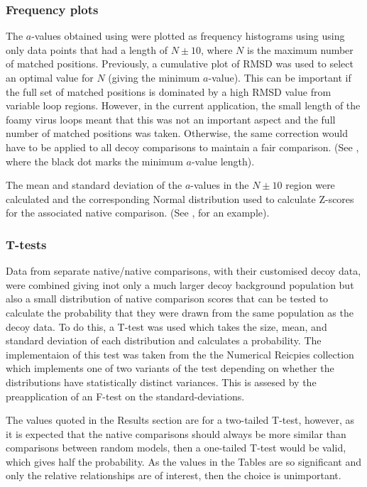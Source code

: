 \subsubsection{Frequency plots}

The $a$-values obtained using  were plotted as frequency histograms using using
only data points that had a length of $N\pm 10$, where $N$ is the maximum number of matched
positions.   Previously, a cumulative plot of RMSD was used to select an optimal value for
$N$ (giving the minimum $a$-value).   This can be important if the full set of matched
positions is dominated by a high RMSD value from variable loop regions.   However, in the
current application, the small length of the foamy virus loops meant that this was not
an important aspect and the full number of matched positions was taken.   Otherwise, the
same correction would have to be applied to all decoy comparisons to maintain a fair
comparison.  (See , where the black dot marks the minimum $a$-value length).

The mean and standard deviation of the $a$-values in the $N\pm10$ region were calculated
and the corresponding Normal distribution used to calculate Z-scores for the associated
native comparison. (See , for an example).

\subsubsection{T-tests}

Data from separate native/native comparisons, with their customised decoy data, were
combined giving inot only a much larger decoy background population but also a small distribution
of native comparison scores that can be tested to calculate the probability that they were
drawn from the same population as the decoy data.  To do this, a T-test was used which takes
the size, mean, and standard deviation of each distribution and calculates a probability.
The implementaion of this test was taken from the the Numerical Reicpies collection \cite{}
which implements one of two variants of the test depending on whether the distributions
have statistically distinct variances.   This is assesed by the preapplication of an F-test
on the standard-deviations. 

The values quoted in the Results section are for a two-tailed T-test, however, as it is expected
that the native comparisons should always be more similar than comparisons between random models,
then a one-tailed T-test would be valid, which gives half the probability.   As the values
in the Tables are so significant and only the relative relationships are of interest,
then the choice is unimportant.
